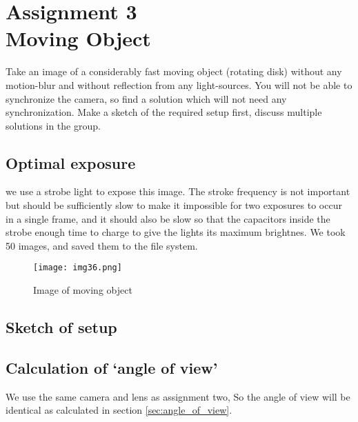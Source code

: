\section {Assignment 3 \\ {Moving Object}}
\label {sec:assignment_3}

Take an image of a considerably fast moving object (rotating disk) without any motion-blur and without reflection from any light-sources. You will not be able to synchronize the camera, so find a solution which will not need any synchronization.
Make a sketch of the required setup first, discuss multiple solutions in the group. \cite{Lab_Assignments}

\subsection{Optimal exposure}

we use a strobe light to expose this image. The stroke frequency is not important but should be sufficiently slow to make it impossible for two exposures to occur in a single frame, and it should also be slow so that the capacitors inside the strobe enough time to charge to give the lights its maximum brightnes. We took 50 images, and saved them to the file system.

\begin{figure}[h!]
    \centering
    \texttt{[image: img36.png]}
    \caption{Image of moving object}
    \label{fig:img36}
\end{figure}

\subsection{Sketch of setup}



\subsection{Calculation of ‘angle of view’}

We use the same camera and lens as assignment two, So the angle of view will be identical as calculated in section \ref{sec:angle_of_view}.